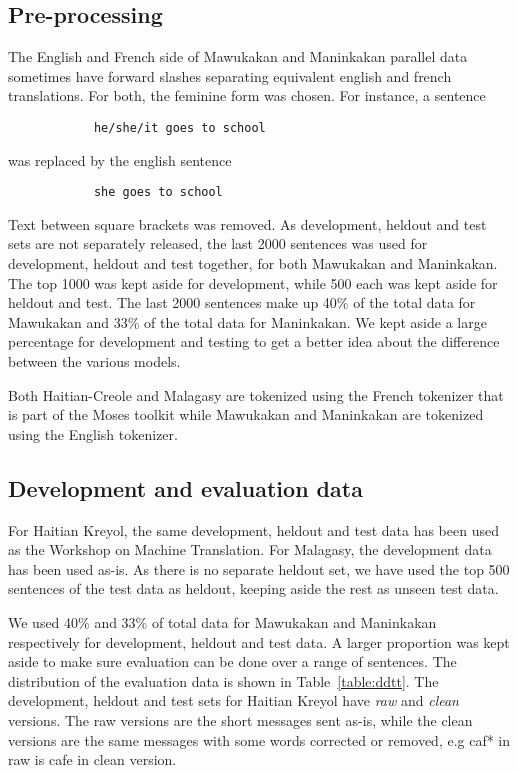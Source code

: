 \subsection{Pre-processing}

    The English and French side of Mawukakan and Maninkakan parallel data sometimes have forward slashes separating equivalent english and french translations. For both, the feminine form was chosen. For instance, a sentence
    \begin{verbatim}
            he/she/it goes to school
    \end{verbatim}
            was replaced by the english sentence \\
    \begin{verbatim}
            she goes to school
    \end{verbatim}

    Text between square brackets was removed. As development, heldout and test sets are not separately released, the last 2000 sentences was used for development, heldout and test together, for both Mawukakan and Maninkakan. The top 1000 was kept aside for development, while 500 each was kept aside for heldout and test. The last 2000 sentences make up 40\% of the total data for Mawukakan and 33\% of the total data for Maninkakan. We kept aside a large percentage for development and testing to get a better idea about the difference between the various models.

    Both Haitian-Creole and Malagasy are tokenized using the French tokenizer that is part of the Moses toolkit while Mawukakan and Maninkakan are tokenized using the English tokenizer.

\subsection{Development and evaluation data}
	For Haitian Kreyol, the same development, heldout and test data has been used as the Workshop on Machine Translation. For Malagasy, the development data has been used as-is. As there is no separate heldout set, we have used the top 500 sentences of the test data as heldout, keeping aside the rest as unseen test data. 

	We used 40\% and 33\% of total data for Mawukakan and Maninkakan respectively for development, heldout and test data. A larger proportion was kept aside to make sure evaluation can be done over a range of sentences. The distribution of the evaluation data is shown in Table~\ref{table:ddtt}. The development, heldout and test sets for Haitian Kreyol have \emph{raw} and \emph{clean} versions. The raw versions are the short messages sent as-is, while the clean versions are the same messages with some words corrected or removed, e.g caf* in raw is cafe in clean version. 


